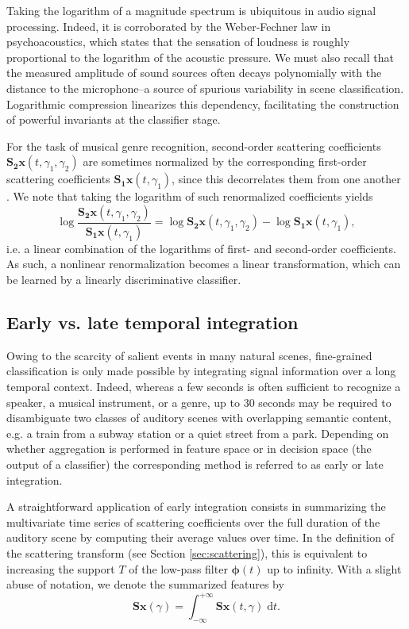 \documentclass[journal]{IEEEtran}
\makeatletter
\newcommand*{\eg}{e.g.\@\xspace}
\newcommand*{\ie}{i.e.\@\xspace}
\newcommand*{\vs}{vs.\@\xspace}
\makeatother
\begin{document}
Taking the logarithm of a magnitude spectrum is ubiquitous in audio signal processing.
Indeed, it is corroborated by the Weber-Fechner law in psychoacoustics, which states that the sensation of loudness is roughly proportional to the logarithm of the acoustic pressure. 
We must also recall that the measured amplitude of sound sources often decays polynomially with the distance to the microphone--a source of spurious variability in scene classification.
Logarithmic compression linearizes this dependency, facilitating the construction of powerful invariants at the classifier stage.

For the task of musical genre recognition, second-order scattering coefficients $\mathbf{S_2}\boldsymbol{x}(t,\gamma_1,\gamma_2)$ are sometimes normalized by the corresponding first-order scattering coefficients $\mathbf{S_1}\boldsymbol{x}(t,\gamma_1)$, since this decorrelates them from one another \cite{Anden2014}.
We note that taking the logarithm of such renormalized coefficients yields
\begin{equation}
\log \dfrac{\mathbf{S_2}\boldsymbol{x}(t,\gamma_1,\gamma_2)}{\mathbf{S_1}\boldsymbol{x}(t,\gamma_1)} =
\log \mathbf{S_2}\boldsymbol{x}(t, \gamma_1, \gamma_2) -
\log \mathbf{S_1}\boldsymbol{x}(t, \gamma_1),
\end{equation}
\ie a linear combination of the logarithms of first- and second-order coefficients.
As such, a nonlinear renormalization becomes a linear transformation, which can be learned by a linearly discriminative classifier.

\subsection{Early \vs late temporal integration}
\label{sec:eili}

Owing to the scarcity of salient events in many natural scenes,
fine-grained classification is only made
possible by integrating signal information over a long temporal context.
Indeed, whereas a few seconds is often sufficient to recognize a speaker,
a musical instrument, or a genre, up to $30$ seconds may be required
to disambiguate two classes of auditory scenes with overlapping semantic content, \eg a train from a subway station or a quiet street from a park.
Depending on whether aggregation is performed in feature space or in decision space (the output of a classifier) the corresponding method is referred to as early or late integration.

A straightforward application of early integration consists in summarizing the multivariate time series of scattering coefficients over the full duration of the auditory scene by computing their average values over time.
In the definition of the scattering transform (see Section \ref{sec:scattering}), this is equivalent to increasing the support $T$ of the low-pass filter $\boldsymbol{\phi}(t)$ up to infinity. With a slight abuse of notation, we denote the summarized features by
\begin{equation}
\mathbf{S}\boldsymbol{x}(\gamma) =
\int_{-\infty}^{+\infty} \mathbf{S}\boldsymbol{x}(t,\gamma)\;\mathrm{d}t\mbox{.}
\end{equation}
\end{document}
